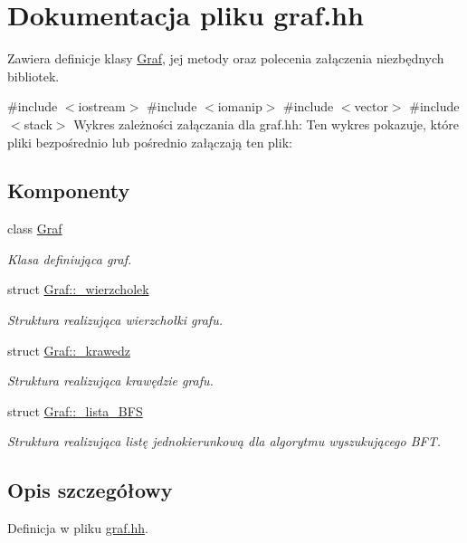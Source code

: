 \hypertarget{graf_8hh}{\section{\-Dokumentacja pliku graf.\-hh}
\label{graf_8hh}
}


\-Zawiera definicje klasy \hyperlink{class_graf}{\-Graf}, jej metody oraz polecenia załączenia niezbędnych bibliotek.  


{\ttfamily \#include $<$iostream$>$}\*
{\ttfamily \#include $<$iomanip$>$}\*
{\ttfamily \#include $<$vector$>$}\*
{\ttfamily \#include $<$stack$>$}\*
\-Wykres zależności załączania dla graf.\-hh\-:
\-Ten wykres pokazuje, które pliki bezpośrednio lub pośrednio załączają ten plik\-:
\subsection*{\-Komponenty}
\begin{DoxyCompactItemize}
\item 
class \hyperlink{class_graf}{\-Graf}
\begin{DoxyCompactList}\small\item\em \-Klasa definiująca graf. \end{DoxyCompactList}\item 
struct \hyperlink{struct_graf_1_1__wierzcholek}{\-Graf\-::\-\_\-wierzcholek}
\begin{DoxyCompactList}\small\item\em \-Struktura realizująca wierzchołki grafu. \end{DoxyCompactList}\item 
struct \hyperlink{struct_graf_1_1__krawedz}{\-Graf\-::\-\_\-krawedz}
\begin{DoxyCompactList}\small\item\em \-Struktura realizująca krawędzie grafu. \end{DoxyCompactList}\item 
struct \hyperlink{struct_graf_1_1__lista___b_f_s}{\-Graf\-::\-\_\-lista\-\_\-\-B\-F\-S}
\begin{DoxyCompactList}\small\item\em \-Struktura realizująca listę jednokierunkową dla algorytmu wyszukującego \-B\-F\-T. \end{DoxyCompactList}\end{DoxyCompactItemize}


\subsection{\-Opis szczegółowy}


\-Definicja w pliku \hyperlink{graf_8hh_source}{graf.\-hh}.

